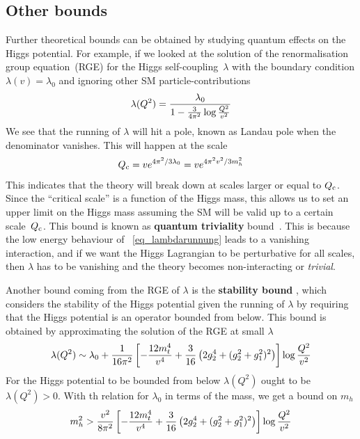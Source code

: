 \subsection{Other bounds}
\par Further theoretical bounds can be obtained by studying quantum effects on the Higgs potential. For example, if we looked at the solution of the renormalisation group equation~(RGE) for the Higgs self-coupling~$\lambda$ with the boundary condition $ \lambda(v)=\lambda_0$ and ignoring other SM particle-contributions
\begin{equation}
	\lambda (Q^2) = \frac{\lambda_0}{1-\frac{3}{4 \pi^2} \log {Q^2\over v^2}}
	\label{eq_lambdarunnung}
\end{equation}
We see that the running of $\lambda$ will hit a pole, known as {Landau pole} when the denominator vanishes. This will happen at the scale
\begin{equation}
	Q_{{\rm c}} = v e^{4 \pi^2/3 \lambda_0} =  v e^{4 \pi^2 v^2/3 m_h^2}
\end{equation}
This indicates that the theory will break down at scales larger or equal to $ Q_{{\rm c}} $. Since the ``critical scale'' is a function of the Higgs mass, this allows us to set an upper limit on the Higgs mass assuming the SM will be valid up to a certain scale~$ Q_{{\rm c}} $. This bound is known as \textbf{quantum triviality } bound~\cite{Lindner:1985uk}. This is because the low energy behaviour of ~\eqref{eq_lambdarunnung} leads to a vanishing interaction, and if we want the Higgs Lagrangian to be perturbative for all scales, then $\lambda$ has to be vanishing and the theory becomes non-interacting or \emph{trivial}. 
\par Another bound coming from the RGE of $\lambda$ is the \textbf{stability bound }, which considers the stability of the Higgs potential given the running of $\lambda$  by requiring that the Higgs potential is an operator bounded from below. This bound is obtained by approximating the solution of the RGE at small $\lambda$ 
\begin{equation}
	\lambda(Q^2)\sim \lambda_0 +\frac{1}{16 \pi^2} \left[ - \frac{12m_t^4}{v^4} + \frac{3}{16} \left( 2g_2^4+(g_2^2+g_1^2)^2\right) \right] \log{Q^2\over v^2}
\end{equation}
For the Higgs potential to be bounded from below $\lambda(Q^2)$ ought to be $\lambda(Q^2) > 0$. With th relation for $\lambda_0$ in terms of the mass, we get a bound on $m_h$ 
\begin{equation}
	m_h^2 > \frac{v^2}{8 \pi^2} \left[ - \frac{12m_t^4}{v^4} + \frac{3}{16} \left( 2g_2^4+(g_2^2+g_1^2)^2\right) \right] \log{Q^2\over v^2}
\end{equation}
